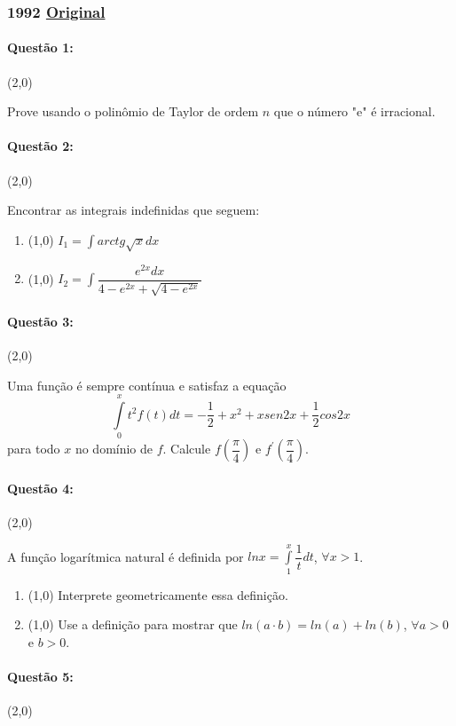 \documentclass[12pt,a4paper]{article}
\newcommand{\original}[1]{\tiny \href{#1}{Original} \normalsize}
\begin{document}
\newpage

\subsubsection{1992 \original{https://drive.google.com/open?id=14iVhKKsen7PL486kJdSmH2OZ0S3nZMcr}}

\paragraph{Questão 1:} (2,0)

Prove usando o polinômio de Taylor de ordem $n$ que o número "e" é irracional.

\paragraph{Questão 2:} (2,0)

Encontrar as integrais indefinidas que seguem:

\begin{enumerate}[label=(\alph*)]
\item (1,0) $I_1=\displaystyle\int arctg \sqrt{x} dx$
\item (1,0) $I_2=\displaystyle\int \dfrac{e^{2x}dx}{4-e^{2x}+\sqrt{4-e^{2x}}}$
\end{enumerate}
\paragraph{Questão 3:} (2,0)

Uma função é sempre contínua e satisfaz a equação $$\displaystyle\int\limits_0^x t^2f(t)dt = -\dfrac{1}{2}+x^2+xsen2x+\dfrac{1}{2}cos2x$$ para todo $x$ no domínio de $f$. Calcule $f(\dfrac{\pi}{4})$ e $f^\prime(\dfrac{\pi}{4})$.

\paragraph{Questão 4:} (2,0)

A função logarítmica natural é definida por $lnx=\displaystyle\int\limits_1^x \dfrac{1}{t}dt$, $\forall x>1$.
\begin{enumerate}[label=(\alph*)]
\item (1,0) Interprete geometricamente essa definição. 
\item (1,0) Use a definição para mostrar que $ln(a\cdot b)=ln(a)+ln(b)$, $\forall a>0$ e $b>0$.
\end{enumerate}
\paragraph{Questão 5:} (2,0)
\end{document}
